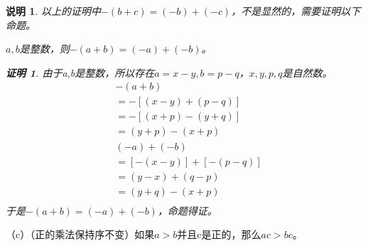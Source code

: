 \documentclass{article}
\theoremstyle{mystyle}
\newtheorem*{zremark}{说明}
\theoremstyle{zproofstyle}
\newtheorem*{zproof}{证明}
\begin{document}
\begin{zgraytheorem}
  \begin{zremark}
    以上的证明中$-(b+c)=(-b)+(-c)$，不是显然的，需要证明以下命题。

    $a,b$是整数，则$-(a+b)=(-a)+(-b)$。
    \begin{zproof}
      由于a,b是整数，所以存在$a=x-y,b=p-q$，$x,y,p,q$是自然数。
      \begin{align*}
         & -(a+b)                \\
         & =-[(x-y)+(p-q)]       \\
         & =-[(x+p)-(y+q)]       \\
         & =(y+p)-(x+p)          \\
         & (-a)+(-b)             \\
         & = [-(x-y)] + [-(p-q)] \\
         & = (y-x) + (q-p)       \\
         & = (y+q) - (x+p)       \\
      \end{align*}
      于是$-(a+b)=(-a)+(-b)$，命题得证。
    \end{zproof}
  \end{zremark}
\end{zgraytheorem}

（c）（正的乘法保持序不变）如果$a>b$并且c是正的，那么$ac > bc$。
\end{document}
